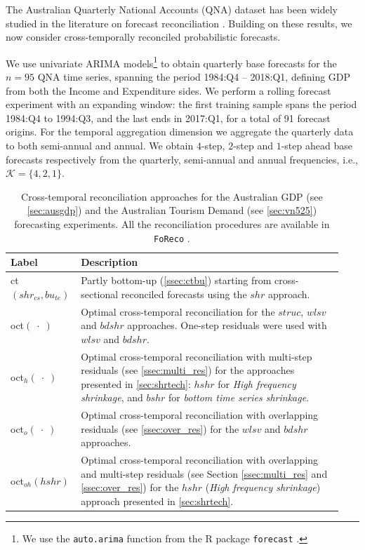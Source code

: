 \documentclass[a4paper,11pt]{article}
\theoremstyle{definition}
\begin{document}
The Australian Quarterly National Accounts (QNA) dataset has been widely studied in the literature on forecast reconciliation \citep{athanasopoulos2020, difonzo2023}. Building on these results, we now consider cross-temporally reconciled probabilistic forecasts.

We use univariate ARIMA models\footnote{We use the \texttt{auto.arima} function from the R package \texttt{forecast} \citep{Rforecast}.} to obtain quarterly base forecasts for the $n = 95$ QNA time series, spanning the period 1984:Q4 -- 2018:Q1, defining GDP from both the Income and Expenditure sides. We perform a rolling forecast experiment with an expanding window: the first training sample spans the period 1984:Q4 to 1994:Q3, and the last ends in 2017:Q1, for a total of 91 forecast origins. For the temporal aggregation dimension we aggregate the quarterly data to both semi-annual and annual. We obtain $4$-step, $2$-step and $1$-step ahead base forecasts respectively from the quarterly, semi-annual and annual frequencies, i.e., $\mathcal{K} = \{4,2,1\}$.


\begin{table}[!t]
	\centering
	\begin{tabular}{M{0.17\linewidth}|L{0.77\linewidth}}
		\toprule
		\textbf{Label} & \textbf{Description} \\
		\midrule
		ct$(shr_{cs}, bu_{te})$ & Partly bottom-up (\autoref{ssec:ctbu}) starting from cross-sectional reconciled forecasts using the $shr$ approach.\\
		\addlinespace[0.15cm]
		oct$(\;\cdot\;)$ & Optimal cross-temporal reconciliation for the $struc$, $wlsv$ and $bdshr$ approaches. One-step residuals were used with $wlsv$ and $bdshr$. \\
		\addlinespace[0.15cm]
		oct$_h(\;\cdot\;)$ & Optimal cross-temporal reconciliation with multi-step residuals (see \autoref{ssec:multi_res}) for the approaches presented in \autoref{sec:shrtech}: $hshr$ for \textit{High frequency shrinkage}, and $bshr$ for \textit{bottom time series shrinkage}.\\
		\addlinespace[0.15cm]
		oct$_o(\;\cdot\;)$ & Optimal cross-temporal reconciliation with overlapping residuals (see \autoref{ssec:over_res}) for the $wlsv$ and $bdshr$ approaches. \\
		\addlinespace[0.15cm]
		oct$_{oh}(hshr)$ & Optimal cross-temporal reconciliation with overlapping and multi-step residuals (see Section \ref{ssec:multi_res} and \ref{ssec:over_res}) for the $hshr$ (\textit{High frequency shrinkage}) approach presented in \autoref{sec:shrtech}.\\
		\bottomrule
	\end{tabular}%
	\caption{Cross-temporal reconciliation approaches for %
	the Australian GDP (see \autoref{sec:ausgdp}) and the Australian Tourism Demand (see \autoref{sec:vn525}) forecasting experiments. All the reconciliation procedures are available in \texttt{FoReco} \citep{foreco2023}.}
	\label{tab:notation}
	\vspace*{-0.5\baselineskip}
\end{table}
\end{document}

